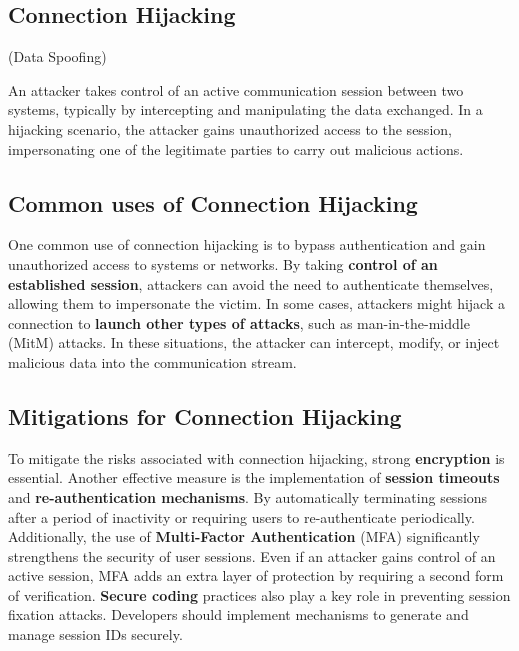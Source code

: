 
\begin{center}
    \section{Connection Hijacking} 

    (Data Spoofing)
\end{center}

An attacker takes control of an active communication session between two systems, typically by intercepting and manipulating the data exchanged. In a hijacking scenario, the attacker gains unauthorized access to the session, impersonating one of the legitimate parties to carry out malicious actions.

\subsection{Common uses of Connection Hijacking}
One common use of connection hijacking is to bypass authentication and gain unauthorized access to systems or networks. By taking \textbf{control of an established session}, attackers can avoid the need to authenticate themselves, allowing them to impersonate the victim. In some cases, attackers might hijack a connection to \textbf{launch other types of attacks}, such as man-in-the-middle (MitM) attacks. In these situations, the attacker can intercept, modify, or inject malicious data into the communication stream.

\subsection{Mitigations for Connection Hijacking}
To mitigate the risks associated with connection hijacking, strong \textbf{encryption} is essential. Another effective measure is the implementation of \textbf{session timeouts} and \textbf{re-authentication mechanisms}. By automatically terminating sessions after a period of inactivity or requiring users to re-authenticate periodically. Additionally, the use of \textbf{Multi-Factor Authentication} (MFA) significantly strengthens the security of user sessions. Even if an attacker gains control of an active session, MFA adds an extra layer of protection by requiring a second form of verification. \textbf{Secure coding} practices also play a key role in preventing session fixation attacks. Developers should implement mechanisms to generate and manage session IDs securely. 


